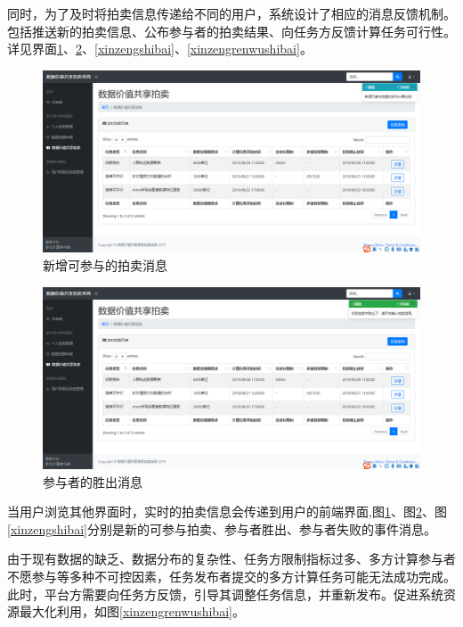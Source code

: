 \documentclass[promaster]{thesis-uestc}
\begin{document}
同时，为了及时将拍卖信息传递给不同的用户，系统设计了相应的消息反馈机制。包括推送新的拍卖信息、公布参与者的拍卖结果、向任务方反馈计算任务可行性。详见界面\ref{xinzengkecanyu}、\ref{xinzengshengchu}、\ref{xinzengshibai}、\ref{xinzengrenwushibai}。

\begin{figure}[H]
    \includegraphics[width=400pt]{ui/xinzengkecanyu.png}
    \caption{新增可参与的拍卖消息}
    \label{xinzengkecanyu}
\end{figure}

\begin{figure}[H]
    \includegraphics[width=400pt]{ui/xinzengshengchu.png}
    \caption{参与者的胜出消息}
    \label{xinzengshengchu}
\end{figure}

当用户浏览其他界面时，实时的拍卖信息会传递到用户的前端界面,图\ref{xinzengkecanyu}、图\ref{xinzengshengchu}、图\ref{xinzengshibai}分别是新的可参与拍卖、参与者胜出、参与者失败的事件消息。

由于现有数据的缺乏、数据分布的复杂性、任务方限制指标过多、多方计算参与者不愿参与等多种不可控因素，任务发布者提交的多方计算任务可能无法成功完成。此时，平台方需要向任务方反馈，引导其调整任务信息，并重新发布。促进系统资源最大化利用，如图\ref{xinzengrenwushibai}。
\end{document}
